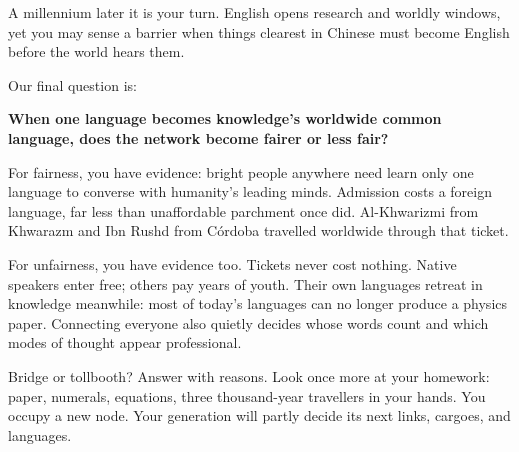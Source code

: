 A millennium later it is your turn. English opens research and worldly windows, yet you may sense a barrier when things clearest in Chinese must become English before the world hears them.

Our final question is:

\textbf{When one language becomes knowledge's worldwide common language, does the network become fairer or less fair?}

For fairness, you have evidence: bright people anywhere need learn only one language to converse with humanity's leading minds. Admission costs a foreign language, far less than unaffordable parchment once did. Al-Khwarizmi from Khwarazm and Ibn Rushd from Córdoba travelled worldwide through that ticket.

For unfairness, you have evidence too. Tickets never cost nothing. Native speakers enter free; others pay years of youth. Their own languages retreat in knowledge meanwhile: most of today's languages can no longer produce a physics paper. Connecting everyone also quietly decides whose words count and which modes of thought appear professional.

Bridge or tollbooth? Answer with reasons. Look once more at your homework: paper, numerals, equations, three thousand-year travellers in your hands. You occupy a new node. Your generation will partly decide its next links, cargoes, and languages.
